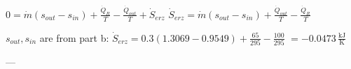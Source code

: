 \( 0 = \dot{m} (s_{out} - s_{in}) + \frac{\dot{Q}_R}{T} - \frac{\dot{Q}_{out}}{T} + \dot{S}_{erz} \)  
\( \dot{S}_{erz} = \dot{m} (s_{out} - s_{in}) + \frac{\dot{Q}_{out}}{T} - \frac{\dot{Q}_R}{T} \)  

\( s_{out}, s_{in} \) are from part b:  
\( \dot{S}_{erz} = 0.3 (1.3069 - 0.9549) + \frac{65}{295} - \frac{100}{295} \)  
\( = -0.0473 \, \frac{\text{kJ}}{\text{K}} \)  

---